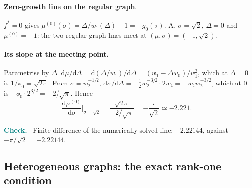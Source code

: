 \documentclass[11pt]{article}
\newcommand{\dd}{\mathrm d}
\newenvironment{verify}{\par\medskip\noindent\textcolor{teal}{\textbf{Check.}}\ }{\par\medskip}
\begin{document}
\paragraph{Zero-growth line on the regular graph.}  $f^*=0$ gives $\mu^{(0)}(\sigma)=\Delta/w_1(\Delta)-1=-g_0(\sigma)$.  At
$\sigma=\sqrt2$, $\Delta=0$ and $\mu^{(0)}=-1$: the two regular-graph lines meet at $(\mu,\sigma)=(-1,\sqrt2)$.

\paragraph{Its slope at the meeting point.}  Parametrise by $\Delta$.  $\dd\mu/\dd\Delta=\dd(\Delta/w_1)/\dd\Delta=(w_1-\Delta w_0)/w_1^2$, which at
$\Delta=0$ is $1/\phi_0=\sqrt{2\pi}$.  From $\sigma=w_2^{-1/2}$, $\dd\sigma/\dd\Delta=-\tfrac12w_2^{-3/2}\cdot2w_1=-w_1w_2^{-3/2}$, which at $0$ is
$-\phi_0\cdot2^{3/2}=-2/\sqrt\pi$.  Hence
\begin{equation}
\frac{\dd\mu^{(0)}}{\dd\sigma}\Big|_{\sigma=\sqrt2}=\frac{\sqrt{2\pi}}{-2/\sqrt\pi}=-\frac{\pi}{\sqrt2}\simeq-2.221 .
\end{equation}
\begin{verify}
Finite difference of the numerically solved line: $-2.22144$, against $-\pi/\sqrt2=-2.22144$.
\end{verify}

\subsection{Heterogeneous graphs: the exact rank-one condition}
\end{document}
